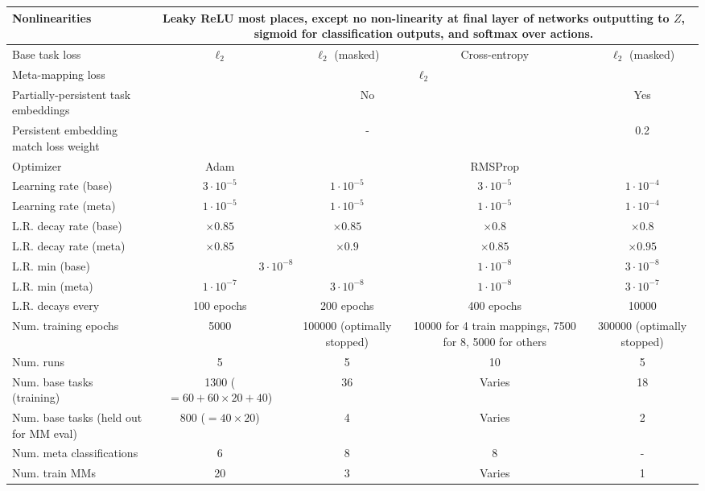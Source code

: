 \begin{table}
\begin{tabular}{|p{3cm}||c|c|c|c|}
Nonlinearities & \multicolumn{4}{p{11cm}|}{Leaky ReLU most places, except no non-linearity at final layer of networks outputting to $Z$, sigmoid for classification outputs, and softmax over actions.} \\\hline
Base task loss & $\ell_2$ & $\ell_2$ (masked) & Cross-entropy & $\ell_2$ (masked)\\\hline
Meta-mapping loss & \multicolumn{4}{c|}{$\ell_2$}\\\hline
Partially-persistent task embeddings & \multicolumn{3}{c|}{No} & Yes \\\hline
Persistent embedding match loss weight & \multicolumn{3}{c|}{-} & 0.2 \\\hline
\hline
Optimizer & Adam & \multicolumn{3}{c|}{RMSProp} \\\hline
Learning rate (base) & $3\cdot 10^{-5}$ & $1\cdot 10^{-5}$ & $3\cdot 10^{-5}$ & $1\cdot 10^{-4}$\\\hline
Learning rate (meta) & $1\cdot 10^{-5}$ & $1\cdot 10^{-5}$ & $1\cdot 10^{-5}$ & $1\cdot 10^{-4}$\\\hline
L.R. decay rate (base) & $\times0.85$ & $\times0.85$ & $\times0.8$ & $\times0.8$\\\hline
L.R. decay rate (meta) & $\times0.85$ & $\times0.9$ & $\times0.85$ & $\times0.95$ \\\hline
L.R. min (base) & \multicolumn{2}{c|}{$3 \cdot 10^{-8}$}  & $1 \cdot 10^{-8}$ & $3 \cdot 10^{-8}$\\\hline
L.R. min (meta) & $1 \cdot 10^{-7}$& $3 \cdot 10^{-8}$ &  $1 \cdot 10^{-8}$ & $3 \cdot 10^{-7}$\\\hline
L.R. decays every & 100 epochs & 200 epochs & 400 epochs & 10000 \\\hline
Num. training epochs & 5000 & \multicolumn{1}{p{2.3cm}|}{100000 (optimally stopped)} & \multicolumn{1}{p{2.3cm}|}{10000 for 4 train mappings, 7500 for 8, 5000 for others} & \multicolumn{1}{p{2.3cm}|}{300000 (optimally stopped)} \\\hline
Num. runs & 5 & 5 & 10 & 5 \\ \hline
\hline
Num. base tasks (training) & \multicolumn{1}{p{2.3cm}|}{1300 ( $= 60 + 60 \times  20 + 40$)} & 36 & Varies & 18 \\\hline
Num. base tasks (held out for MM eval) & 800 ($= 40 \times 20$)  & 4 & Varies & 2 \\\hline
Num. meta classifications & 6 & 8 & 8 & - \\\hline
Num. train MMs & 20 & 3 & Varies & 1 \\\hline

\end{tabular}
\end{table}
